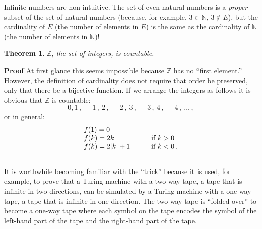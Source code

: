 \documentclass[12pt,a4paper]{article}
\newtheorem{theorem}{Theorem}
\newcommand*{\qed}{\hfill\rule[-2pt]{4pt}{10pt}}
\newenvironment{proof}{\textbf{Proof}}{\qed}
\begin{document}
Infinite numbers are non-intuitive. The set of even natural numbers is a \emph{proper} subset of the set of natural numbers (because, for example, $3\in \mathbb{N},\, 3\not\in E$), but the cardinality of $E$ (the number of elements in $E$) is the same as the cardinality of $\mathbb{N}$ (the number of elements in $\mathbb{N}$)!

\begin{theorem}
$\mathbb{Z}$, the set of integers, is countable.
\end{theorem}

\begin{proof}
At first glance this seems impossible because $\mathbb{Z}$ has no ``first element.'' However, the definition of cardinality does not require that order be preserved, only that there be a bijective function. If we arrange the integers as follows it is obvious that $\mathbb{Z}$ is countable:
\[
0,1\,,\:-1\,,\:2\,,\:-2\,,\:3\,,\:-3\,,\:4\,,\:-4\,,\:\ldots\,,
\]
or in general:
\[
\begin{array}{l@{\hspace{3em}}l}
f(1)=0\\
f(k)=2k & \textrm{if\ } k>0\\
f(k)=2|k|+1 & \textrm{if\ } k<0\,.
\end{array}
\]
\end{proof}

It is worthwhile becoming familiar with the ``trick'' because it is used, for example, to prove that a Turing machine with a two-way tape, a tape that is infinite in two directions, can be simulated by a Turing machine with a one-way tape, a tape that is infinite in one direction. The two-way tape is ``folded over'' to become a one-way tape where each symbol on the tape encodes the symbol of the left-hand part of the tape and the right-hand part of the tape.
\end{document}
